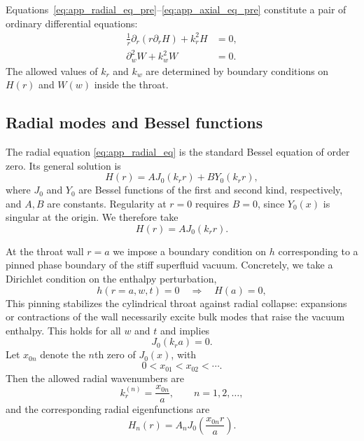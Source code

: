 \documentclass[12pt]{article}
\begin{document}
Equations~\eqref{eq:app_radial_eq_pre}--\eqref{eq:app_axial_eq_pre}
constitute a pair of ordinary differential equations:
\begin{align}
  \frac{1}{r}\partial_r\!\left(r\partial_r H\right)
  + k_r^2 H &= 0,
  \label{eq:app_radial_eq}
  \\
  \partial_w^2 W
  + k_w^2 W &= 0.
  \label{eq:app_axial_eq}
\end{align}
The allowed values of $k_r$ and $k_w$ are determined by boundary conditions
on $H(r)$ and $W(w)$ inside the throat.

\subsection{Radial modes and Bessel functions}

The radial equation \eqref{eq:app_radial_eq} is the standard Bessel equation
of order zero.  Its general solution is
\begin{equation}
  H(r)
  = A J_0(k_r r) + B Y_0(k_r r),
\end{equation}
where $J_0$ and $Y_0$ are Bessel functions of the first and second kind,
respectively, and $A,B$ are constants.  Regularity at $r=0$ requires $B=0$,
since $Y_0(x)$ is singular at the origin.  We therefore take
\begin{equation}
  H(r) = A J_0(k_r r).
\end{equation}

At the throat wall $r=a$ we impose a boundary condition on $h$ corresponding
to a pinned phase boundary of the stiff superfluid vacuum.  Concretely, we
take a Dirichlet condition on the enthalpy perturbation,
\begin{equation}
  h(r=a,w,t) = 0
  \quad\Rightarrow\quad
  H(a) = 0,
\end{equation}
This pinning stabilizes the cylindrical throat against radial collapse:
expansions or contractions of the wall necessarily excite bulk modes that
raise the vacuum enthalpy.  This holds for all $w$ and $t$ and implies
\begin{equation}
  J_0(k_r a) = 0.
\end{equation}
Let $x_{0n}$ denote the $n$th zero of $J_0(x)$, with
\begin{equation}
  0 < x_{01} < x_{02} < \cdots.
\end{equation}
Then the allowed radial wavenumbers are
\begin{equation}
  k_r^{(n)}
  = \frac{x_{0n}}{a},
  \qquad
  n = 1,2,\dots,
\end{equation}
and the corresponding radial eigenfunctions are
\begin{equation}
  H_n(r)
  = A_n J_0\!\left(\frac{x_{0n} r}{a}\right).
\end{equation}
\end{document}
